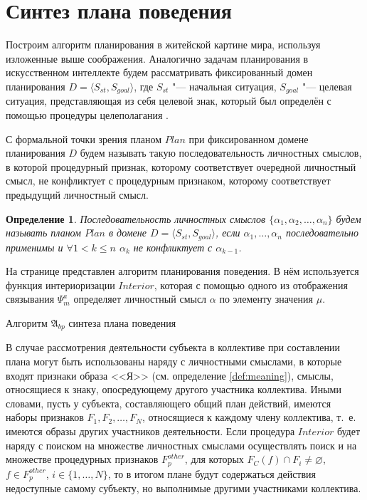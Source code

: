 \documentclass[a4paper, 12pt]{article}
\theoremstyle{plain}
\newtheorem{Def}{Определение}
\newcommand{\stretchsize}{2}
\renewcommand{\baselinestretch}{\stretchsize}
\begin{document}
	\section{Синтез плана поведения} \label{sect:plan}
	Построим алгоритм планирования в житейской картине мира, используя изложенные выше соображения. Аналогично задачам планирования в искусственном интеллекте \cite{Fikes1971} будем рассматривать фиксированный домен планирования $D=\langle S_{st},S_{goal} \rangle$, где $S_{st}$ "--- начальная ситуация, $S_{goal}$ "--- целевая ситуация, представляющая из себя целевой знак, который был определён с помощью процедуры целеполагания \cite{PanovA2014a}. 
	
	С формальной точки зрения планом $Plan$ при фиксированном домене планирования $D$ будем называть такую последовательность личностных смыслов, в которой процедурный признак, которому соответствует очередной личностный смысл, не конфликтует с процедурным признаком, которому соответствует предыдущий личностный смысл.
	
	\begin{Def}
		Последовательность личностных смыслов $\{\alpha_1,\alpha_2,\dots,\alpha_n\}$ будем называть планом $Plan$ в домене $D=\langle S_{st},S_{goal} \rangle$, если $\alpha_1,\dots,\alpha_n$ последовательно применимы и $\forall 1<k\leqslant n$ $\alpha_k$ не конфликтует с $\alpha_{k-1}$.
	\end{Def}

	На странице \pageref{alg:beh_plan} представлен алгоритм планирования поведения. В нём используется функция интериоризации $Interior$, которая с помощью одного из отображения связывания $\Psi_m^a$ \cite{PanovA2014a} определяет личностный смысл $\alpha$ по элементу значения $\mu$.
	\renewcommand{\baselinestretch}{1}	
	\begin{algorithm}[h]
		\caption{Алгоритм $\mathfrak{A}_{bp}$ синтеза плана поведения}\label{alg:beh_plan}
		\begin{algorithmic}[1]
			
		\end{algorithmic}
	\end{algorithm}
	\renewcommand{\baselinestretch}{\stretchsize}	

	В случае рассмотрения деятельности субъекта в коллективе при составлении плана могут быть использованы наряду с личностными смыслами, в которые входят признаки образа <<Я>> (см. определение \ref{def:meaning}), смыслы, относящиеся к знаку, опосредующему другого участника коллектива. Иными словами, пусть у субъекта, составляющего общий план действий, имеются наборы признаков $F_1,F_2,\dots,F_N$, относящиеся к каждому члену коллектива, т.~е. имеются образы других участников деятельности. Если процедура $Interior$ будет наряду с поиском на множестве личностных смыслами осуществлять поиск и на множестве процедурных признаков $F_p^{other}$, для которых $F_C(f)\cap F_i\not = \varnothing$, $f\in F_p^{other}$, $i\in\{1,\dots,N\}$, то в итогом плане будут содержаться действия недоступные самому субъекту, но выполнимые другими участниками коллектива.
	
\end{document}
